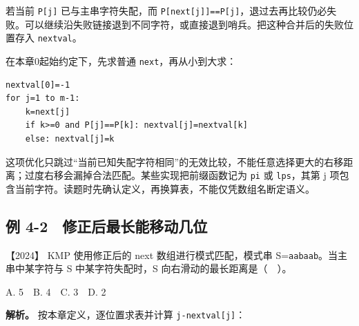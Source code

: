 若当前 \texttt{P{[}j{]}} 已与主串字符失配，而 \texttt{P{[}next{[}j{]}{]}==P{[}j{]}}，退过去再比较仍必失败。可以继续沿失败链接退到不同字符，或直接退到哨兵。把这种合并后的失败位置存入 \texttt{nextval}。

在本章0起始约定下，先求普通 \texttt{next}，再从小到大求：

\par\medskip\noindent
\begin{minipage}{\linewidth}
\begin{verbatim}
nextval[0]=-1
for j=1 to m-1:
    k=next[j]
    if k>=0 and P[j]==P[k]: nextval[j]=nextval[k]
    else: nextval[j]=k
\end{verbatim}
\end{minipage}\par\medskip

这项优化只跳过``当前已知失配字符相同''的无效比较，不能任意选择更大的右移距离；过度右移会漏掉合法匹配。某些实现把前缀函数记为 \texttt{pi} 或 \texttt{lps}，其第 j 项包含当前字符。读题时先确认定义，再换算表，不能仅凭数组名断定语义。

\subsection{例 4-2　修正后最长能移动几位}\label{ds-ex4-2}

\noindent{}【2024】 KMP 使用修正后的 next 数组进行模式匹配，模式串 S=\texttt{aabaab}。当主串中某字符与 S 中某字符失配时，S 向右滑动的最长距离是（　）。

A. 5　B. 4　C. 3　D. 2


\textbf{解析。} 按本章定义，逐位置求表并计算 \texttt{j-nextval{[}j{]}}：

